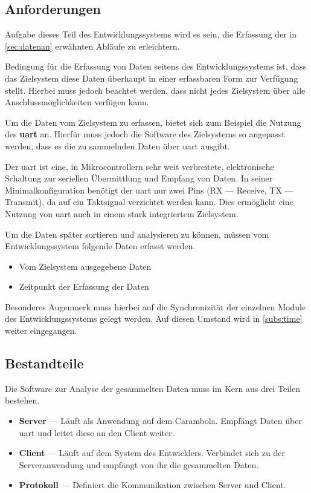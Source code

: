 \subsection{Anforderungen}
Aufgabe dieses Teil des Entwicklungssystems wird es sein, die Erfassung der in
\autoref{sec:datenan} erwähnten Abläufe zu erleichtern.

Bedingung für die Erfassung von Daten seitens des Entwicklungssystems ist, dass
das Zielsystem diese Daten überhaupt in einer erfassbaren Form zur Verfügung
stellt. Hierbei muss jedoch beachtet werden, dass nicht jedes Zielsystem über
alle Anschlussmöglichkeiten verfügen kann.

Um die Daten vom Zielsystem zu erfassen, bietet sich zum Beispiel die Nutzung
des \textbf{\gls{uart}} an. Hierfür muss jedoch die Software des Zielsystems so
angepasst werden, dass es die zu sammelnden Daten über \gls{uart} ausgibt.

\begin{definition}[UART]
Der \gls{uart} ist eine, in Mikrocontrollern sehr weit verbreitete,
elektronische Schaltung zur seriellen Übermittlung und Empfang von Daten. In
seiner Minimalkonfiguration benötigt der \gls{uart} nur zwei Pins (RX ---
Receive, TX --- Transmit), da auf ein Taktsignal verzichtet werden kann. Dies
ermöglicht eine Nutzung von \gls{uart} auch in einem stark integriertem
Zielsystem.
\end{definition}

\begin{minipage}[c]{\textwidth}
Um die Daten später sortieren und analysieren zu können, müssen vom
Entwicklungssystem folgende Daten erfasst werden.
\begin{itemize}
  \item Vom Zielsystem ausgegebene Daten
  \item Zeitpunkt der Erfassung der Daten
\end{itemize}
\end{minipage}

Besonderes Augenmerk muss hierbei auf die Synchronizität der einzelnen Module
des Entwicklungssystems gelegt werden. Auf diesen Umstand wird in
\autoref{subs:time} weiter eingegangen. 

\subsection{Bestandteile}
\begin{minipage}[c]{\textwidth}
Die Software zur Analyse der gesammelten Daten muss im Kern aus drei Teilen
bestehen.
\begin{itemize}
  \item \textbf{Server} --- Läuft als Anwendung auf dem Carambola. Empfängt
  Daten über \gls{uart} und leitet diese an den Client weiter.
  \item \textbf{Client} --- Läuft auf dem System des Entwicklers. Verbindet sich
  zu der Serveranwendung und empfängt von ihr die gesammelten Daten.
  \item \textbf{Protokoll} --- Definiert die Kommunikation zwischen Server und
  Client.
\end{itemize}
\end{minipage}

